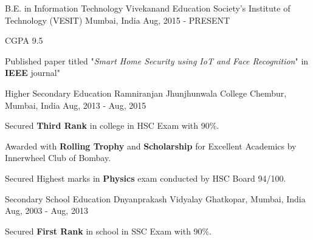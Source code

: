 \begin{cventries}

  \cventry
    {B.E. in Information Technology}
    {Vivekanand Education Society's Institute of Technology (VESIT)}
    {Mumbai, India}
    {Aug, 2015 - PRESENT}
    {
      \begin{cvitems}
        \item { CGPA  9.5}
        \item{Published paper titled "\textit{Smart Home Security using IoT and Face Recognition}" in \textbf{IEEE} journal"}
        \
      \end{cvitems}
    }
    \cventry
    {Higher Secondary Education}
    {Ramniranjan Jhunjhunwala College}
    {Chembur, Mumbai, India}
    {Aug, 2013 - Aug, 2015}
    {
      \begin{cvitems}
        \item { Secured \textbf{Third Rank} in college in HSC Exam with 90\%.}
        \item {Awarded with \textbf{Rolling Trophy} and \textbf{Scholarship} for Excellent Academics by Innerwheel Club of Bombay.}
        \item{Secured Highest marks in \textbf{Physics} exam conducted by HSC Board 94/100.}
      \end{cvitems}
    }
    \cventry
    {Secondary School Education}
    {Dnyanprakash Vidyalay}
    {Ghatkopar, Mumbai, India}
    {Aug, 2003 - Aug, 2013}
    {
      \begin{cvitems}
        \item { Secured \textbf{First Rank} in school in SSC Exam with 90\%.}
      \end{cvitems}
    }
\end{cventries}
